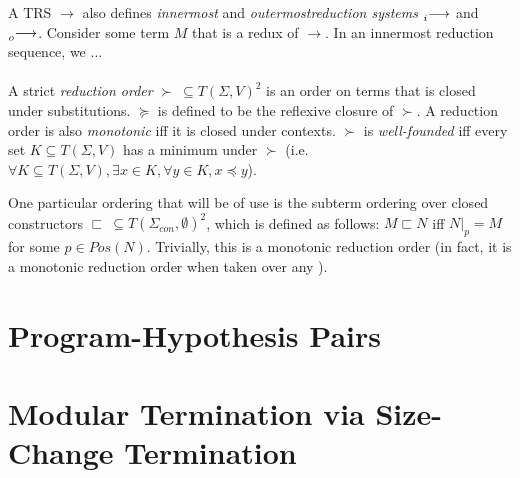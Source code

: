 \documentclass{article}
\theoremstyle{definition}
\newcommand{\subterm}{\sqsubset}
\begin{document}
A TRS $\longrightarrow$ also defines \emph{innermost} and \emph{outermostreduction systems} $\prescript{}{i}{\longrightarrow}$ and $\prescript{}{o}{\longrightarrow}$. Consider some term $M$ that is a redux of $\longrightarrow$. In an innermost reduction sequence, we ...
\\~\\
A strict \emph{reduction order} $\succ ~ \subseteq T(\Sigma, V)^2$ is an order on terms that is closed under substitutions.  $\succeq$ is defined to be the reflexive closure of $\succ$. A reduction order is also \emph{monotonic} iff it is closed under contexts. $\succ$ is \emph{well-founded} iff every set $K \subseteq T(\Sigma, V)$ has a minimum under $\succ$ (i.e. $\forall K \subseteq T(\Sigma, V), \exists x \in K, \forall y \in K, x \preceq y$).

One particular ordering that will be of use is the subterm ordering over closed constructors $\subterm ~\subseteq T(\Sigma_{con}, \emptyset)^2$, which is defined as follows: $M \subterm N$ iff $N|_p = M$ for some $p \in Pos(N)$. Trivially, this is a monotonic reduction order (in fact, it is a monotonic reduction order when taken over any ). 

\section{Program-Hypothesis Pairs}

\section{Modular Termination via Size-Change Termination}
\end{document}
